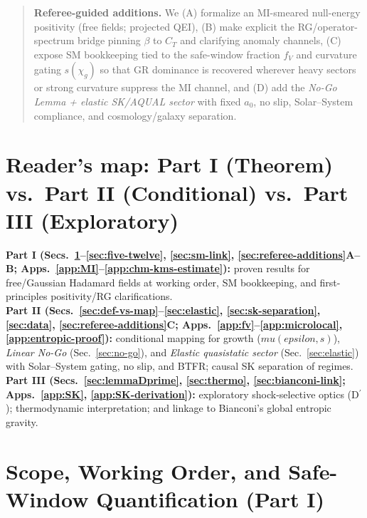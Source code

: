 \documentclass[aps,prd,onecolumn,superscriptaddress,nofootinbib]{revtex4-2}
\def\eps{epsilon}%
\def\mu{mu}%
\providecommand{\eps}{\varepsilon}
\begin{document}
\begin{abstract}
\smallskip
\textbf{Referee-guided additions.} We (A) formalize an MI-smeared null-energy positivity (free fields; projected QEI), (B) make explicit the RG/operator-spectrum bridge pinning \(\beta\) to \(C_T\) and clarifying anomaly channels, (C) expose SM bookkeeping tied to the safe-window fraction \(f_V\) and curvature gating \(s(\chi_g)\) so that GR dominance is recovered wherever heavy sectors or strong curvature suppress the MI channel, and (D) add the \emph{No-Go Lemma + elastic SK/AQUAL sector} with fixed \(a_0\), no slip, Solar–System compliance, and cosmology/galaxy separation.
\end{abstract}

\maketitle

\section*{Reader’s map: Part I (Theorem) vs.\ Part II (Conditional) vs.\ Part III (Exploratory)}
\noindent \textbf{Part I (Secs.~\ref{sec:scope}–\ref{sec:five-twelve}, \ref{sec:sm-link}, \ref{sec:referee-additions}A–B; Apps.~\ref{app:MI}–\ref{app:chm-kms-estimate}):} proven results for free/Gaussian Hadamard fields at working order, SM bookkeeping, and first-principles positivity/RG clarifications.\\
\textbf{Part II (Secs.~\ref{sec:def-vs-map}–\ref{sec:elastic}, \ref{sec:sk-separation}, \ref{sec:data}, \ref{sec:referee-additions}C; Apps.~\ref{app:fv}–\ref{app:microlocal}, \ref{app:entropic-proof}):} conditional mapping for growth (\(\mu(\eps,s)\)), \emph{Linear No-Go} (Sec.~\ref{sec:no-go}), and \emph{Elastic quasistatic sector} (Sec.~\ref{sec:elastic}) with Solar–System gating, no slip, and BTFR; causal SK separation of regimes.\\
\textbf{Part III (Secs.~\ref{sec:lemmaDprime}, \ref{sec:thermo}, \ref{sec:bianconi-link}; Apps.~\ref{app:SK}, \ref{app:SK-derivation}):} exploratory shock-selective optics (D\(^{\prime}\)); thermodynamic interpretation; and linkage to Bianconi’s global entropic gravity.

\section{Scope, Working Order, and Safe-Window Quantification (Part I)}
\label{sec:scope}
\end{document}
